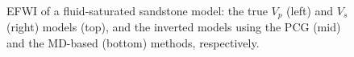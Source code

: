 \begin{figure}
\begin{center}
        \caption{
            EFWI of a fluid-saturated sandstone model: the true $V_p$ (left) and $V_s$
            (right) models (top),
            and the inverted models using the PCG (mid) and the MD-based (bottom)
            methods, respectively.
    }
    \label{fig:smallmodel}
    \end{center}
\end{figure}
